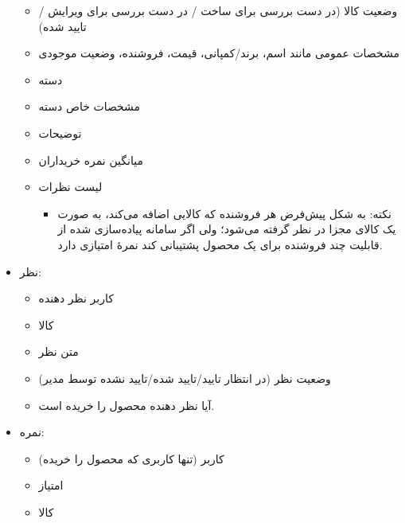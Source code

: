 \documentclass[]{article}
\begin{document}
\begin{itemize}
\begin{itemize}
\item
وضعیت کالا (در دست بررسی برای ساخت / در دست بررسی برای ویرایش / تایید شده)

\item
مشخصات عمومی مانند اسم، برند/کمپانی، قیمت، فروشنده، وضعیت موجودی

\item
دسته

\item
مشخصات خاص دسته

\item
توضیحات

\item
میانگین نمره خریداران

\item
لیست نظرات

\begin{itemize}[label = $\blacksquare$]
\item
نکته: به شکل پیش‌فرض هر فروشنده که کالایی اضافه می‌کند، به صورت یک کالای مجزا در نظر گرفته می‌شود؛ ولی اگر سامانه پیاده‌سازی شده از قابلیت چند فروشنده برای یک محصول پشتیبانی کند نمرهٔ امتیازی دارد.
\end{itemize}

\end{itemize}
\newpage
\item
نظر:

\begin{itemize}
\item
کاربر نظر دهنده

\item
کالا

\item
متن نظر

\item
وضعیت نظر (در انتظار تایید/تایید شده/تایید نشده توسط مدیر)

\item
آیا نظر دهنده محصول را خریده است.

\end{itemize}

\item
نمره:

\begin{itemize}

\item
کاربر (تنها کاربری که محصول را خریده)

\item
امتیاز

\item
کالا

\end{itemize}


\end{itemize}
\end{document}
